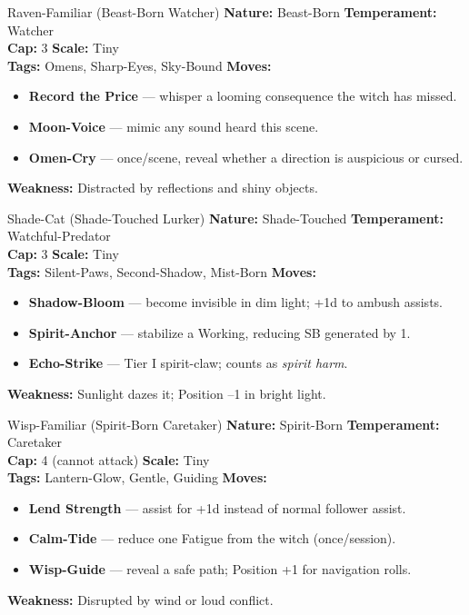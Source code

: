 \documentclass[11pt]{book}
\begin{document}
\begin{creaturebox}{Raven-Familiar (Beast-Born Watcher)}
\textbf{Nature:} Beast-Born \quad \textbf{Temperament:} Watcher \\
\textbf{Cap:} 3 \quad \textbf{Scale:} Tiny \\
\textbf{Tags:} Omens, Sharp-Eyes, Sky-Bound  
\textbf{Moves:}
\begin{itemize}[leftmargin=1.5em, noitemsep]
    \item \textbf{Record the Price} --- whisper a looming consequence the witch has missed.
    \item \textbf{Moon-Voice} --- mimic any sound heard this scene.
    \item \textbf{Omen-Cry} --- once/scene, reveal whether a direction is auspicious or cursed.
\end{itemize}
\textbf{Weakness:} Distracted by reflections and shiny objects.
\end{creaturebox}

\begin{creaturebox}{Shade-Cat (Shade-Touched Lurker)}
\textbf{Nature:} Shade-Touched \quad \textbf{Temperament:} Watchful-Predator \\
\textbf{Cap:} 3 \quad \textbf{Scale:} Tiny \\
\textbf{Tags:} Silent-Paws, Second-Shadow, Mist-Born  
\textbf{Moves:}
\begin{itemize}[leftmargin=1.5em, noitemsep]
    \item \textbf{Shadow-Bloom} --- become invisible in dim light; +1d to ambush assists.
    \item \textbf{Spirit-Anchor} --- stabilize a Working, reducing SB generated by 1.
    \item \textbf{Echo-Strike} --- Tier I spirit-claw; counts as \emph{spirit harm}.
\end{itemize}
\textbf{Weakness:} Sunlight dazes it; Position --1 in bright light.
\end{creaturebox}

\begin{creaturebox}{Wisp-Familiar (Spirit-Born Caretaker)}
\textbf{Nature:} Spirit-Born \quad \textbf{Temperament:} Caretaker \\
\textbf{Cap:} 4 (cannot attack) \quad \textbf{Scale:} Tiny \\
\textbf{Tags:} Lantern-Glow, Gentle, Guiding  
\textbf{Moves:}
\begin{itemize}[leftmargin=1.5em, noitemsep]
    \item \textbf{Lend Strength} --- assist for +1d instead of normal follower assist.
    \item \textbf{Calm-Tide} --- reduce one Fatigue from the witch (once/session).
    \item \textbf{Wisp-Guide} --- reveal a safe path; Position +1 for navigation rolls.
\end{itemize}
\textbf{Weakness:} Disrupted by wind or loud conflict.
\end{creaturebox}
\end{document}
